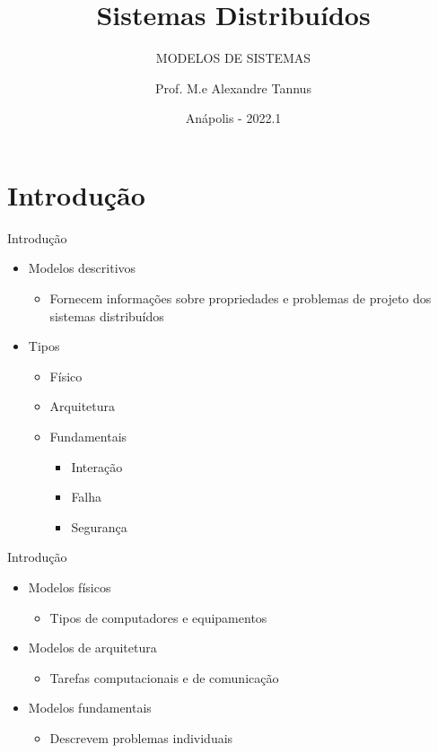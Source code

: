 \documentclass[aspectratio=169,
				xcolor=table]{beamer}
\institute[]{\uppercase{Engenharia de Software}}
\title[]{Sistemas Distribuídos}
\subtitle[]{\uppercase{Modelos de Sistemas}}
\author[]{Prof. M.e Alexandre Tannus}
\date{Anápolis - 2022.1}
\begin{document}
	\begin{frame}
		\titlepage		
	\end{frame}

	\begin{frame}
		\tableofcontents
	\end{frame}	

	\section{Introdução}

	\begin{frame}{Introdução}
		\begin{itemize}
			\item Modelos descritivos
			\begin{itemize}
				\item Fornecem informações sobre propriedades e problemas de projeto dos sistemas distribuídos
			\end{itemize}
			\vspace{1em}
			\item Tipos
			\begin{itemize}
				\item Físico
				\item Arquitetura
				\item Fundamentais
				\begin{itemize}
					\item Interação
					\item Falha
					\item Segurança
				\end{itemize}
			\end{itemize}
		\end{itemize}
	\end{frame}
	
	\begin{frame}{Introdução}
		\begin{itemize}
			\item Modelos físicos
			\begin{itemize}
				\item Tipos de computadores e equipamentos
			\end{itemize}
			\vspace{1em}
			\item Modelos de arquitetura
			\begin{itemize}
				\item Tarefas computacionais e de comunicação
			\end{itemize}
			\vspace{1em}
			\item Modelos fundamentais
			\begin{itemize}
				\item Descrevem problemas individuais
			\end{itemize}
		\end{itemize}	
	
	\end{frame}
\end{document}
